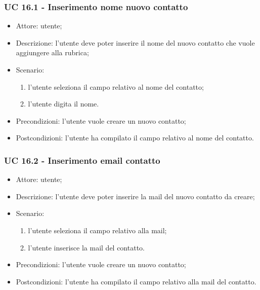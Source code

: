 \subsubsection{UC 16.1 - Inserimento nome nuovo contatto} \label{sec: UC 16.1}
\begin{itemize}
    \item Attore: utente;
    \item Descrizione: l'utente deve poter inserire il nome del nuovo contatto che vuole aggiungere alla rubrica;
    \item Scenario:
        \begin{enumerate}
        \item l'utente seleziona il campo relativo al nome del contatto;
        \item l'utente digita il nome.
        \end{enumerate}
    
    \item Precondizioni: l'utente vuole creare un nuovo contatto;
    \item Postcondizioni: l'utente ha compilato il campo relativo al nome del contatto.
\end{itemize}


\subsubsection{UC 16.2 - Inserimento email contatto} \label{sec: UC 16.2}
\begin{itemize}
    \item Attore: utente;
    \item Descrizione: l'utente deve poter inserire la mail del nuovo contatto da creare;
    \item Scenario:
        \begin{enumerate}
        \item l'utente seleziona il campo relativo alla mail;
        \item l'utente inserisce la mail del contatto.
        \end{enumerate}
    
    \item Precondizioni: l'utente vuole creare un nuovo contatto;
    \item Postcondizioni: l'utente ha compilato il campo relativo alla mail del contatto.
\end{itemize}



